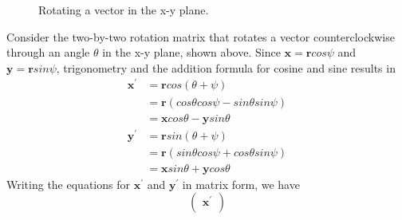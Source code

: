 \documentclass[oneside]{book}
\begin{document}
{{\begin{figure}[H]
\begin{center}
            \end{center}
            \caption{Rotating a vector in the x-y plane.}
        \end{figure}
        Consider the two-by-two rotation matrix that rotates a vector counterclockwise through an angle $\theta$ in the x-y plane, shown above. Since $\mathbf{x}=\mathbf{r}cos{\psi}$ and $\mathbf{y}=\mathbf{r}sin{\psi}$, trigonometry and the addition formula for cosine and sine results in
        \begin{align}
            \mathbf{x}^{'}&=\mathbf{r}cos({\theta}+{\psi})\\
                         &=\mathbf{r}(cos{\theta}cos{\psi}-sin{\theta}sin{\psi})\\
                         &=\mathbf{x}cos{\theta}-\mathbf{y}sin{\theta}
        \end{align}
        \begin{align}
            \mathbf{y}^{'}&=\mathbf{r}sin({\theta}+{\psi})\\
                         &=\mathbf{r}(sin{\theta}cos{\psi}+cos{\theta}sin{\psi})\\
                         &=\mathbf{x}sin{\theta}+\mathbf{y}cos{\theta}
        \end{align}
        Writing the equations for $\mathbf{x}^{'}$ and $\mathbf{y}^{'}$ in matrix form, we have
        \[
            \begin{pmatrix}
                \mathbf{x}^{'}\\

\end{pmatrix}\]}}
\end{document}
